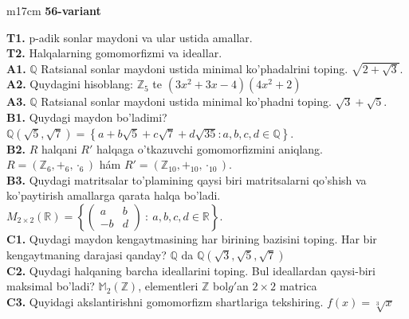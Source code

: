 \documentclass{article}
\begin{document}
\begin{tabular}{m{17cm}}
\textbf{56-variant}
\newline

\textbf{T1.} p-adik sonlar maydoni va ular ustida amallar. \\
\textbf{T2.} Halqalarning gomomorfizmi va ideallar. \\
\textbf{A1.} \(\mathbb{Q}\) Ratsianal sonlar maydoni ustida minimal ko'phadalrini toping.
\(\sqrt{2 + \sqrt{3}}\). \\
\textbf{A2.} Quydagini hisoblang:
\(\mathbb{Z}_{5}\) te \(\left( 3x^{2} + 3x - 4 \right)\left( 4x^{2} + 2 \right)\) \\
\textbf{A3.} \(\mathbb{Q}\) Ratsianal sonlar maydoni ustida minimal ko'phadni toping.
\(\sqrt{3} + \sqrt{5}\). \\
\textbf{B1.} Quydagi maydon bo'ladimi?
\(\mathbb{Q}\left( \sqrt{5},\sqrt{7} \right) = \left\{ a + b\sqrt{5} + c\sqrt{7} + d\sqrt{35}:a,b,c,d \in \mathbb{Q} \right\}\). \\
\textbf{B2.} \(R\) halqani \(R'\) halqaga o'tkazuvchi gomomorfizmini aniqlang.
\(R = (\mathbb{Z}_{6}, +_{6}, \cdot_{6})\) hám \(R' = (\mathbb{Z}_{10}, +_{10}, \cdot_{10})\). \\
\textbf{B3.} Quydagi matritsalar to'plamining qaysi biri matritsalarni qo'shish va ko'paytirish amallarga qarata halqa bo'ladi.
\(M_{2 \times 2}\mathbb{(R) =}\left\{ \begin{pmatrix}
a & b \\
 - b & d
\end{pmatrix}\ :\ a,b,c,d \in \mathbb{R} \right\}\). \\
\textbf{C1.} Quydagi maydon kengaytmasining har birining bazisini toping. Har bir kengaytmaning darajasi qanday?
\(\mathbb{Q}\) da \(\mathbb{Q}\left( \sqrt{3},\sqrt{5},\sqrt{7} \right)\) \\
\textbf{C2.} Quydagi halqaning barcha ideallarini toping. Bul ideallardan qaysi-biri maksimal bo'ladi?
\(\mathbb{M}_{2}\left( \mathbb{Z} \right)\), elementleri \(\mathbb{Z}\) bol\(g'\)an \(2 \times 2\) matrica \\
\textbf{C3.} Quyidagi akslantirishni gomomorfizm shartlariga tekshiring. \(f(x) = \sqrt[3]{x}\) \\

\end{tabular}
\vspace{1cm}
\end{document}
